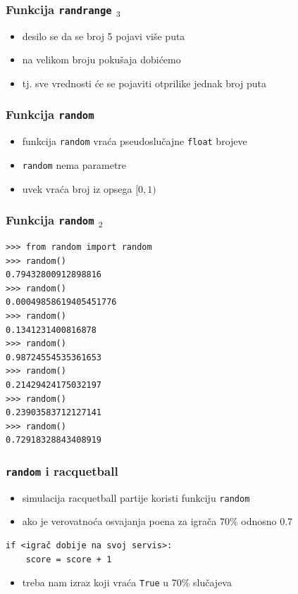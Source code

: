 \documentclass[utf8,compress]{beamer}
\begin{document}
\begin{frame}
  \frametitle{Funkcija \texttt{randrange} $_3$}
  \begin{itemize}
    \item desilo se da se broj 5 pojavi više puta
    \item na velikom broju pokušaja dobićemo 
    \item tj. sve vrednosti će se pojaviti otprilike jednak broj puta
  \end{itemize}
\end{frame}

\begin{frame}
  \frametitle{Funkcija \texttt{random}}
  \begin{itemize}
    \item funkcija \texttt{random} vraća pseudoslučajne \texttt{float} brojeve
    \item \texttt{random} nema parametre
    \item uvek vraća broj iz opsega $[0,1)$
  \end{itemize}
\end{frame}

\begin{frame}[fragile]
  \frametitle{Funkcija \texttt{random} $_2$}
\begin{verbatim}
>>> from random import random
>>> random()
0.79432800912898816
>>> random()
0.00049858619405451776
>>> random()
0.1341231400816878
>>> random()
0.98724554535361653
>>> random()
0.21429424175032197
>>> random()
0.23903583712127141
>>> random()
0.72918328843408919
\end{verbatim}
\end{frame}

\begin{frame}[fragile]
  \frametitle{\texttt{random} i racquetball}
  \begin{itemize}
    \item simulacija racquetball partije koristi funkciju \texttt{random}
    \item ako je verovatnoća osvajanja poena za igrača 70\% odnosno 0.7
  \end{itemize}
\begin{verbatim}
if <igrač dobije na svoj servis>:
    score = score + 1
\end{verbatim}
  \begin{itemize}
    \item treba nam izraz koji vraća \texttt{True} u 70\% slučajeva
  \end{itemize}
\end{frame}
\end{document}
